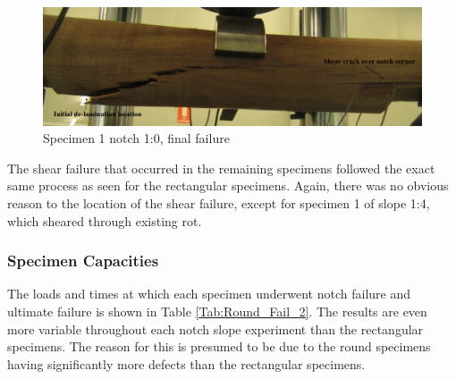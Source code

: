 \documentclass[11pt,a4paper]{article}
\numberwithin{equation}{subsection}
\begin{document}
\vspace*{\baselineskip}

\begin{figure}[h]
	\begin{center}
		\includegraphics[scale=0.4]{Shear_knot}
	\end{center}
	\caption{Specimen 1 notch 1:0, final failure}
	\label{fig:Shear_knot}
\end{figure}

\noindent
The shear failure that occurred in the remaining specimens followed the exact same process as seen for the rectangular specimens. Again, there was no obvious reason to the location of the shear failure, except for specimen 1 of slope 1:4, which sheared through existing rot. 

\subsubsection{Specimen Capacities}
The loads and times at which each specimen underwent notch failure and ultimate failure is shown in Table \ref{Tab:Round_Fail_2}. The results are even more variable throughout each notch slope experiment than the rectangular specimens. The reason for this is presumed to be due to the round specimens having significantly more defects than the rectangular specimens.

\vspace*{\baselineskip}
\end{document}
